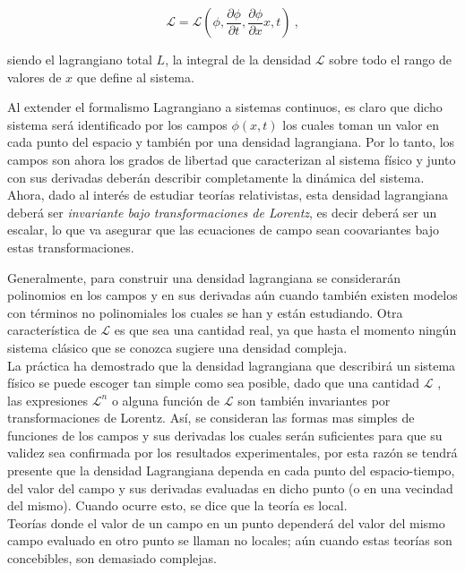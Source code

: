 \begin{equation}
\mathcal{L}=\mathcal{L}\left(\phi ,\frac{\partial \phi }{\partial t},\frac{\partial \phi }{\partial x}x,t\right) ~,  \label{2.17n}
\end{equation}

\noindent
siendo el lagrangiano total $L$, la integral de la densidad $\mathcal{L}$ sobre todo el
rango de valores de $x$ que define al sistema.\\

\noindent
\begin{cabox}
Al extender el formalismo Lagrangiano a sistemas continuos, es claro que dicho sistema será identificado por los campos $\phi(x,t)$ los cuales toman un valor en cada punto del espacio y también por una densidad lagrangiana. Por lo tanto, los campos son ahora los grados de libertad que caracterizan al sistema físico y junto con sus derivadas deberán describir completamente la dinámica del sistema.\\

\noindent
Ahora, dado al interés de estudiar teorías relativistas, esta densidad lagrangiana deberá ser \emph{invariante bajo transformaciones de Lorentz}, es decir deberá ser un escalar, lo que va asegurar que las ecuaciones de campo sean coovariantes bajo estas transformaciones.\\
\end{cabox}

\noindent
Generalmente, para construir una densidad lagrangiana se considerarán polinomios en los campos y en sus derivadas aún cuando también existen modelos con términos no polinomiales los cuales se han y están estudiando. Otra característica de $\mathcal{L}$ es que sea una cantidad real, ya que hasta el momento ningún sistema clásico que se conozca sugiere una densidad compleja.\\

\noindent
La práctica ha demostrado que la densidad lagrangiana que describirá un sistema físico se puede escoger tan simple como sea posible, dado que una cantidad $\mathcal{L}$ , las expresiones $\mathcal{L}^{n}$ o alguna función de $\mathcal{L}$ son también invariantes por transformaciones de Lorentz. Así, se consideran las formas mas simples de funciones de los campos y sus derivadas los cuales serán suficientes para que su validez sea confirmada por los resultados experimentales, por esta razón se tendrá presente que la densidad Lagrangiana dependa en cada punto del espacio-tiempo, del valor del campo y sus derivadas evaluadas en dicho punto (o  en una vecindad del mismo). Cuando ocurre esto, se dice que la teoría es local.\\
Teorías donde el valor de un campo en un punto dependerá del valor del mismo campo evaluado en otro punto se llaman no locales; aún cuando estas teorías son concebibles, son demasiado complejas.\\


